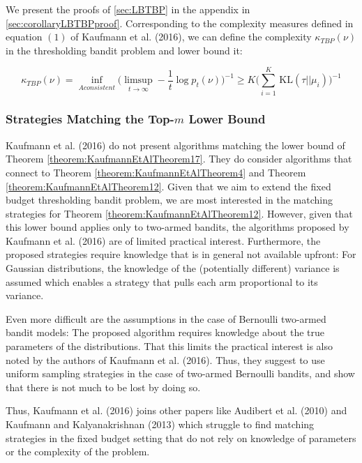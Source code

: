 \documentclass[11pt,]{article}
\newcommand{\KL}{\,\text{KL}}
\begin{document}
\label{corollary:LBKTBP}

We present the proofs of \autoref{sec:LBTBP} in the appendix in
\autoref{sec:corollaryLBTBPproof}. Corresponding to the complexity
measures defined in equation \((1)\) of Kaufmann et al. (2016), we can
define the complexity \(\kappa_{TBP}(\nu)\) in the thresholding bandit
problem and lower bound it:

\[
\kappa_{TBP}(\nu) = \inf_{A consistent} \Big(\limsup_{t \rightarrow \infty} - \frac{1}{t} \log p_t(\nu)\Big)^{-1} \geq K \Big(\sum_{i=1}^{K} \KL(\tau||\mu_i)\Big)^{-1}
\]

\subsubsection{\texorpdfstring{Strategies Matching the Top-\(m\) Lower
Bound}{Strategies Matching the Top-m Lower Bound}}\label{strategies-matching-the-top-m-lower-bound}

Kaufmann et al. (2016) do not present algorithms matching the lower
bound of Theorem \ref{theorem:KaufmannEtAlTheorem17}. They do consider
algorithms that connect to Theorem \ref{theorem:KaufmannEtAlTheorem4}
and Theorem \ref{theorem:KaufmannEtAlTheorem12}. Given that we aim to
extend the fixed budget thresholding bandit problem, we are most
interested in the matching strategies for Theorem
\ref{theorem:KaufmannEtAlTheorem12}. However, given that this lower
bound applies only to two-armed bandits, the algorithms proposed by
Kaufmann et al. (2016) are of limited practical interest. Furthermore,
the proposed strategies require knowledge that is in general not
available upfront: For Gaussian distributions, the knowledge of the
(potentially different) variance is assumed which enables a strategy
that pulls each arm proportional to its variance.

Even more difficult are the assumptions in the case of Bernoulli
two-armed bandit models: The proposed algorithm requires knowledge about
the true parameters of the distributions. That this limits the practical
interest is also noted by the authors of Kaufmann et al. (2016). Thus,
they suggest to use uniform sampling strategies in the case of two-armed
Bernoulli bandits, and show that there is not much to be lost by doing
so.

Thus, Kaufmann et al. (2016) joins other papers like Audibert et al.
(2010) and Kaufmann and Kalyanakrishnan (2013) which struggle to find
matching strategies in the fixed budget setting that do not rely on
knowledge of parameters or the complexity of the problem.
\end{document}
